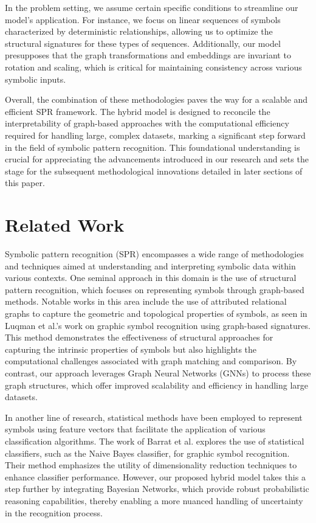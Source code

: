 \documentclass{article}
\begin{document}
In the problem setting, we assume certain specific conditions to streamline our model's application. For instance, we focus on linear sequences of symbols characterized by deterministic relationships, allowing us to optimize the structural signatures for these types of sequences. Additionally, our model presupposes that the graph transformations and embeddings are invariant to rotation and scaling, which is critical for maintaining consistency across various symbolic inputs.

Overall, the combination of these methodologies paves the way for a scalable and efficient SPR framework. The hybrid model is designed to reconcile the interpretability of graph-based approaches with the computational efficiency required for handling large, complex datasets, marking a significant step forward in the field of symbolic pattern recognition. This foundational understanding is crucial for appreciating the advancements introduced in our research and sets the stage for the subsequent methodological innovations detailed in later sections of this paper.

\section{Related Work}
Symbolic pattern recognition (SPR) encompasses a wide range of methodologies and techniques aimed at understanding and interpreting symbolic data within various contexts. One seminal approach in this domain is the use of structural pattern recognition, which focuses on representing symbols through graph-based methods. Notable works in this area include the use of attributed relational graphs to capture the geometric and topological properties of symbols, as seen in Luqman et al.'s work on graphic symbol recognition using graph-based signatures. This method demonstrates the effectiveness of structural approaches for capturing the intrinsic properties of symbols but also highlights the computational challenges associated with graph matching and comparison. By contrast, our approach leverages Graph Neural Networks (GNNs) to process these graph structures, which offer improved scalability and efficiency in handling large datasets.

In another line of research, statistical methods have been employed to represent symbols using feature vectors that facilitate the application of various classification algorithms. The work of Barrat et al. explores the use of statistical classifiers, such as the Naive Bayes classifier, for graphic symbol recognition. Their method emphasizes the utility of dimensionality reduction techniques to enhance classifier performance. However, our proposed hybrid model takes this a step further by integrating Bayesian Networks, which provide robust probabilistic reasoning capabilities, thereby enabling a more nuanced handling of uncertainty in the recognition process.
\end{document}
